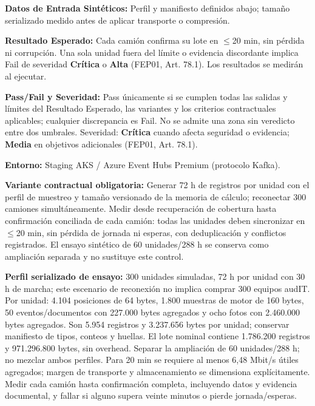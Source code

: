 \par\noindent\textbf{Datos de Entrada Sintéticos:} Perfil y manifiesto definidos abajo; tamaño serializado medido antes de aplicar transporte o compresión.\par
\par\noindent\textbf{Resultado Esperado:} Cada camión confirma su lote en \(\le\)20 min, sin pérdida ni corrupción. Una sola unidad fuera del límite o evidencia discordante implica Fail de severidad \textbf{Crítica} o \textbf{Alta} (FEP01, Art. 78.1). Los resultados se medirán al ejecutar.\par
\par\noindent\textbf{Pass/Fail y Severidad:} Pass únicamente si se cumplen todas las salidas y límites del Resultado Esperado, las variantes y los criterios contractuales aplicables; cualquier discrepancia es Fail. No se admite una zona sin veredicto entre dos umbrales. Severidad: \textbf{Crítica} cuando afecta seguridad o evidencia; \textbf{Media} en objetivos adicionales (FEP01, Art. 78.1).\par
\par\noindent\textbf{Entorno:} Staging AKS / Azure Event Hubs Premium (protocolo Kafka).\par

\par\noindent\textbf{Variante contractual obligatoria:} Generar 72 h de registros por unidad con el perfil de muestreo y tamaño versionado de la memoria de cálculo; reconectar 300 camiones simultáneamente. Medir desde recuperación de cobertura hasta confirmación conciliada de cada camión: todas las unidades deben sincronizar en \(\le\)20 min, sin pérdida de jornada ni esperas, con deduplicación y conflictos registrados. El ensayo sintético de 60 unidades/288 h se conserva como ampliación separada y no sustituye este control.\par

\par\noindent\textbf{Perfil serializado de ensayo:} 300 unidades simuladas, 72 h por unidad con 30 h de marcha; este escenario de reconexión no implica comprar 300 equipos audIT. Por unidad: 4.104 posiciones de 64 bytes, 1.800 muestras de motor de 160 bytes, 50 eventos/documentos con 227.000 bytes agregados y ocho fotos con 2.460.000 bytes agregados. Son 5.954 registros y 3.237.656 bytes por unidad; conservar manifiesto de tipos, conteos y huellas. El lote nominal contiene 1.786.200 registros y 971.296.800 bytes, sin overhead. Separar la ampliación de 60 unidades/288 h; no mezclar ambos perfiles. Para 20 min se requiere al menos 6,48 Mbit/s útiles agregados; margen de transporte y almacenamiento se dimensiona explícitamente. Medir cada camión hasta confirmación completa, incluyendo datos y evidencia documental, y fallar si alguno supera veinte minutos o pierde jornada/esperas.\par

